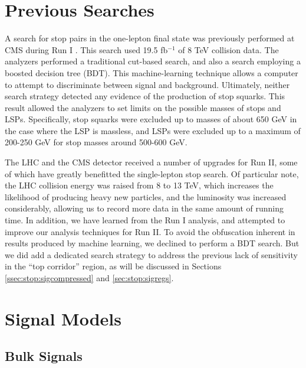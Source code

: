 \section{Previous Searches}
\label{sec:stop:run1}

A search for stop pairs in the one-lepton final state was previously
performed at CMS during Run I \cite{stop1l8tev}. This search used 19.5
fb$^{-1}$ of 8 TeV collision data. The analyzers performed a traditional
cut-based search, and also a search employing a boosted decision tree
(BDT). This machine-learning technique allows a computer to attempt to
discriminate between signal and background. Ultimately, neither search
strategy detected any evidence of the production of stop squarks. This
result allowed the analyzers to set limits on the possible masses of
stops and LSPs. Specifically, stop squarks were excluded up to masses
of about 650 GeV in the case where the LSP is massless, and LSPs were
excluded up to a maximum of 200-250 GeV for stop masses around 500-600
GeV.

The LHC and the CMS detector received a number of upgrades for Run II,
some of which have greatly benefitted the single-lepton stop
search. Of particular note, the LHC collision energy was raised from 8
to 13 TeV, which increases the likelihood of producing heavy new
particles, and the luminosity was increased considerably, allowing us %
to record more data in the same amount of running time. In addition,
we have learned from the Run I analysis, and attempted to improve our
analysis techniques for Run II. To avoid the obfuscation inherent in
results produced by machine learning, we declined to perform a BDT
search. But we did add a dedicated search strategy to address the
previous lack of sensitivity in the ``top corridor'' region, as will
be discussed in Sections \ref{ssec:stop:sigcompressed} and
\ref{sec:stop:sigregs}.


\section{Signal Models}
\label{sec:stop:sigmodels}

\subsection{Bulk Signals}
\label{ssec:stop:sigbulk}

